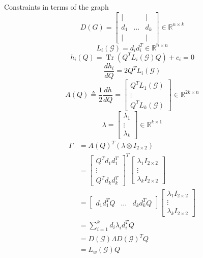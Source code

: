 \documentclass[conference]{IEEEtran}
\DeclareMathOperator{\Tr}{Tr}
\begin{document}
Constraints in terms of the graph
$$D(G)= \begin{bmatrix}
    | & & |\\
    d_1 & \hdots & d_k\\
    | & & |
\end{bmatrix}\in\mathbb{R}^{n\times k}$$
$$L_i(\mathcal{G})=d_id_i^T\in\mathbb{R}^{n\times n}$$
$$h_i(Q)=\Tr(Q^TL_i(\mathcal{G})Q)+c_i=0$$
$$\frac{dh_i}{dQ}=2Q^TL_i(\mathcal{G})$$
$$A(Q)\triangleq\frac{1}{2}\frac{dh}{dQ}=\begin{bmatrix}
    Q^TL_1(\mathcal{G})\\ \vdots\\ Q^TL_k(\mathcal{G})
\end{bmatrix}\in\mathbb{R}^{2k\times n}$$
$$\lambda=\begin{bmatrix}
    \lambda_1\\ \vdots\\ \lambda_k
\end{bmatrix}\in\mathbb{R}^{k\times 1}$$
\begin{align*}
    \Gamma&=A(Q)^T(\lambda\otimes I_{2\times2})\\
    &=\begin{bmatrix}
        Q^Td_1d_1^T\\ \vdots\\ Q^Td_kd_k^T
    \end{bmatrix}^T\begin{bmatrix}
        \lambda_1I_{2\times2}\\ \vdots\\ \lambda_kI_{2\times2}
    \end{bmatrix}\\
    &=\begin{bmatrix}
        d_1d_1^TQ & \hdots & d_kd_k^TQ
    \end{bmatrix}\begin{bmatrix}
        \lambda_1I_{2\times2}\\ \vdots\\ \lambda_kI_{2\times2}
    \end{bmatrix}\\
    &= \sum_{i=1}^k d_i\lambda_id_i^TQ\\
    &= D(\mathcal{G})\Lambda D(\mathcal{G})^TQ\\
    &= L_w(\mathcal{G})Q
\end{align*}
\end{document}
